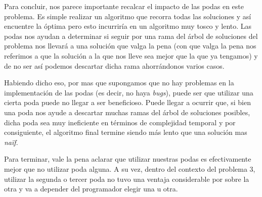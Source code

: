 Para concluir, nos parece importante recalcar el impacto de las podas en este problema. Es simple realizar un algoritmo que recorra todas las soluciones y así encuentre la óptima pero esto incurriría en un algoritmo muy tosco y lento. Las podas nos ayudan a determinar si seguir por una rama del árbol de soluciones del problema nos llevará a una solución que valga la pena (con que valga la pena nos referimos a que la solución a la que nos lleve sea mejor que la que ya tengamos) y de no ser así podemos descartar dicha rama ahorrándonos varios casos.

Habiendo dicho eso, por mas que supongamos que no hay problemas en la implementación de las podas (es decir, no haya \emph{bugs}), puede ser que utilizar una cierta poda puede no llegar a ser beneficioso. Puede llegar a ocurrir que, si bien una poda nos ayude a descartar muchas ramas del árbol de soluciones posibles, dicha poda sea muy ineficiente en términos de complejidad temporal y por consiguiente, el algoritmo final termine siendo más lento que una solución mas \emph{naïf}.

Para terminar, vale la pena aclarar que utilizar nuestras podas es efectivamente mejor que no utilizar poda alguna. A su vez, dentro del contexto del problema 3, utilizar la segunda o tercer poda no tuvo una ventaja considerable por sobre la otra y va a depender del programador elegir una u otra.